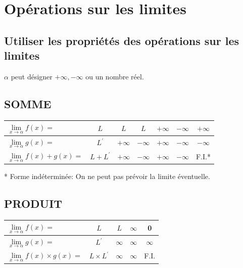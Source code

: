 \section{Opérations sur les limites}

\subsection{Utiliser les propriétés des opérations sur les limites}

$\alpha$ peut désigner $+\infty,-\infty$ ou un nombre réel.


\subsection*{SOMME}
\begin{center}
	\begin{tabular}{|l|c|c|c|c|c|c|}
		\hline
		$\lim \limits_{x \rightarrow \alpha} f(x)=$ & $L$ & $L$ & $L$ & $+\infty$ & $-\infty$ & $+\infty$ \\
		\hline
		$\lim \limits_{x \rightarrow \alpha} g(x)=$ & $L^{\prime}$ & $+\infty$ & $-\infty$ & $+\infty$ & $-\infty$ & $-\infty$ \\
		\hline
		$\lim \limits_{x \rightarrow \alpha} f(x)+g(x)=$ & $L+L^{\prime}$ & $+\infty$ & $-\infty$ & $+\infty$ & $-\infty$ & F.I.* \\
		\hline
	\end{tabular}
\end{center}

	* Forme indéterminée: On ne peut pas prévoir la limite éventuelle.

\subsection*{PRODUIT}

\begin{center}
	\begin{tabular}{|l|c|c|c|c|}
		\hline
		$\lim \limits_{x \rightarrow \alpha} f(x)=$ & $L$ & $L$ & $\infty$ & 0 \\
		\hline
		$\lim \limits_{x \rightarrow \alpha} g(x)=$ & $L^{\prime}$ & $\infty$ & $\infty$ & $\infty$ \\
		\hline
		$\lim \limits_{x \rightarrow \alpha} f(x) \times g(x)=$ & $L \times L^{\prime}$ & $\infty$ & $\infty$ & F.I. \\
		\hline
	\end{tabular}
\end{center}

